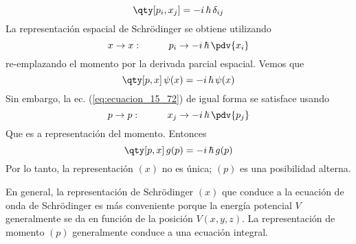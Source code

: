 \begin{equation}
\qty[p_{i}, x_{j}] = - i \, \hbar \, \delta_{i j}
\label{eq:ecuacion_15_73}
\end{equation}
La representación espacial de Schrödinger se obtiene utilizando
\[ x \to x : \hspace{1cm} p_{i} \to - i \, \hbar \, \pdv{x_{i}} \]
re-emplazando el momento por la derivada parcial espacial. Vemos que
\begin{equation}
\qty[p, x] \, \psi (x) = - i \, \hbar \, \psi(x)
\label{eq:ecuacion_15_74}
\end{equation}
Sin embargo, la ec. (\ref{eq:ecuacion_15_72}) de igual forma se satisface usando
\[p \to p : \hspace{1cm} x_{j} \to - i \, \hbar \, \pdv{p_{j}} \]
Que es a representación del momento. Entonces
\begin{equation}
\qty[p, x] \, g (p) = - i \, \hbar \, g (p)
\label{eq:ecuacion_15_75}
\end{equation}
Por lo tanto, la representación $(x)$ no es única; $(p)$ es una posibilidad alterna.
\par
En general, la representación de Schrödinger $(x)$ que conduce a la ecuación de onda de Schrödinger es más conveniente porque la energía potencial $V$ generalmente se da en función de la posición $V (x, y, z)$. La representación de momento $(p)$ generalmente conduce a una ecuación integral.

